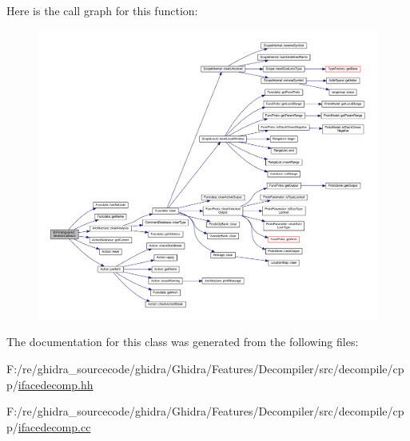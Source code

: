 Here is the call graph for this function\+:
\nopagebreak
\begin{figure}[H]
\begin{center}
\leavevmode
\includegraphics[width=350pt]{class_ifc_print_inputs_all_af1ed619938898b1dd91be98c256a7512_cgraph}
\end{center}
\end{figure}


The documentation for this class was generated from the following files\+:\begin{DoxyCompactItemize}
\item 
F\+:/re/ghidra\+\_\+sourcecode/ghidra/\+Ghidra/\+Features/\+Decompiler/src/decompile/cpp/\mbox{\hyperlink{ifacedecomp_8hh}{ifacedecomp.\+hh}}\item 
F\+:/re/ghidra\+\_\+sourcecode/ghidra/\+Ghidra/\+Features/\+Decompiler/src/decompile/cpp/\mbox{\hyperlink{ifacedecomp_8cc}{ifacedecomp.\+cc}}\end{DoxyCompactItemize}
